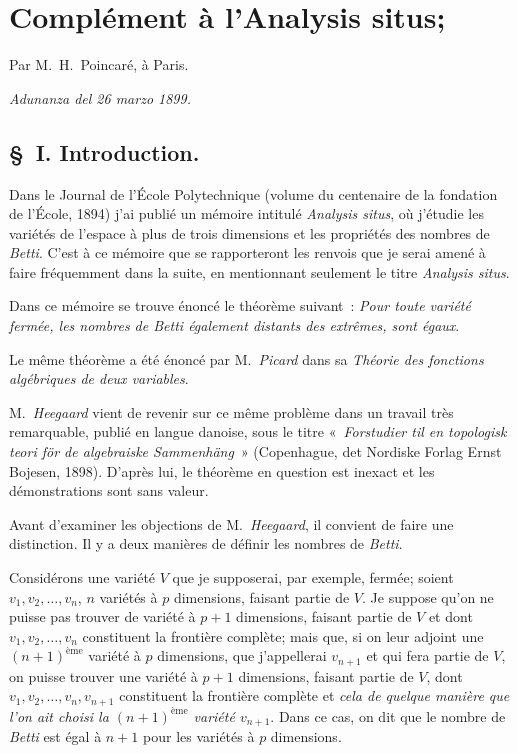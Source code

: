 \documentclass{article}
\begin{document}
\section*{Complément à l'Analysis situs;}

Par M.~H.~Poincaré, à Paris.

\emph{Adunanza del 26 marzo 1899.}

\subsection*{\S~I. Introduction.}

Dans le Journal de l'École Polytechnique (volume du centenaire de la fondation de l'École, 1894) j'ai publié un mémoire intitulé \emph{Analysis situs}, où j'étudie les variétés de l'espace à plus de trois dimensions et les propriétés des nombres de \emph{Betti}. C'est à ce mémoire que se rapporteront les renvois que je serai amené à faire fréquemment dans la suite, en mentionnant seulement le titre \emph{Analysis situs}.

Dans ce mémoire se trouve énoncé le théorème suivant~: \emph{Pour toute variété fermée, les nombres de Betti également distants des extrêmes, sont égaux}.

Le même théorème a été énoncé par M.~\emph{Picard} dans sa \emph{Théorie des fonctions algébriques de deux variables}.

M.~\emph{Heegaard} vient de revenir sur ce même problème dans un travail très remarquable, publié en langue danoise, sous le titre «~\emph{Forstudier til en topologisk teori för de algebraiske Sammenhäng}~» (Copenhague, det Nordiske Forlag Ernst Bojesen, 1898). D'après lui, le théorème en question est inexact et les démonstrations sont sans valeur.


Avant d'examiner les objections de M.~\emph{Heegaard}, il convient de faire une distinction. Il y a deux manières de définir les nombres de \emph{Betti}.

Considérons une variété $V$ que je supposerai, par exemple, fermée; soient $v_{1}, v_{2}, \ldots, v_{n}$, $n$ variétés à $p$ dimensions, faisant partie de $V$. Je suppose qu'on ne puisse pas trouver de variété à $p+1$ dimensions, faisant partie de $V$ et dont $v_{1}, v_{2}, \ldots, v_{n}$ constituent la frontière complète; mais que, si on leur adjoint une $(n+1)^{\text{ème}}$ variété à $p$ dimensions, que j'appellerai $v_{n+1}$ et qui fera partie de $V$, on puisse trouver une variété à $p+1$ dimensions, faisant partie de $V$, dont $v_{1}, v_{2}, \ldots, v_{n}, v_{n+1}$ constituent la frontière complète et \emph{cela de quelque manière que l'on ait choisi la $(n+1)^{\text{ème}}$ variété $v_{n+1}$}. Dans ce cas, on dit que le nombre de \emph{Betti} est égal à $n+1$ pour les variétés à $p$ dimensions.
\end{document}
